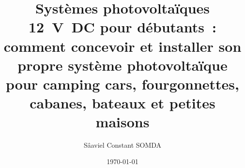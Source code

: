 

	\title{Systèmes photovoltaïques 12~V~DC pour débutants~: comment concevoir et installer son propre système photovoltaïque pour camping cars, fourgonnettes, cabanes, bateaux et petites maisons}
	\author{Sâaviel Constant SOMDA}
	\date{\today}
	\maketitle
	\setcounter{tocdepth}{3}
	\tableofcontents
	
	
	
	
	
	
	
	\nocite{*}
	\printbibliography[heading=bibintoc,title={Bibliographie}]


